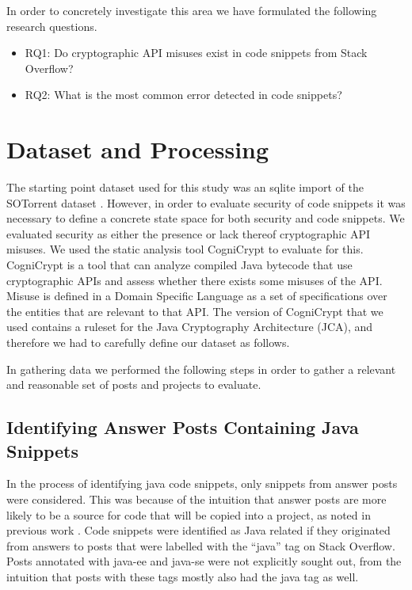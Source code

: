 \documentclass[10pt, conference]{IEEEtran}
\begin{document}
In order to concretely investigate this area we have formulated the following research questions.


\begin{itemize}
\item  RQ1: Do cryptographic API misuses exist in code snippets from Stack Overflow?

\item  RQ2: What is the most common error detected in code snippets?


\end{itemize}



\section{Dataset and Processing}

The starting point dataset used for this study was an sqlite import of the SOTorrent dataset \cite{wong_2019}. However, in order to evaluate security of code snippets it was necessary to define a concrete state space for both security and code snippets. We evaluated security as either the presence or lack thereof cryptographic API misuses. We used the static analysis tool CogniCrypt \cite{krger_et_al:LIPIcs:2018:9215} to evaluate for this. CogniCrypt is a tool that can analyze compiled Java bytecode that use cryptographic APIs and assess whether there exists some misuses of the API. Misuse is defined in a Domain Specific Language as a set of specifications over the entities that are relevant to that API. The version of CogniCrypt that we used contains a ruleset for the Java Cryptography Architecture (JCA), and therefore we had to carefully define our dataset as follows.

In gathering data we performed the following steps in order to gather a relevant and reasonable set of posts and projects to evaluate.

\subsection{Identifying Answer Posts Containing Java Snippets}
In the process of identifying java code snippets, only snippets from answer posts were considered. This was because of the intuition that answer posts are more likely to be a source for code that will be copied into a project, as noted in previous work \cite{7958574}. Code snippets were identified as Java related if they originated from answers to posts that were labelled with the “java” tag on Stack Overflow. Posts annotated with java-ee and java-se were not explicitly sought out, from the intuition that posts with these tags mostly also had the java tag as well.
\end{document}
